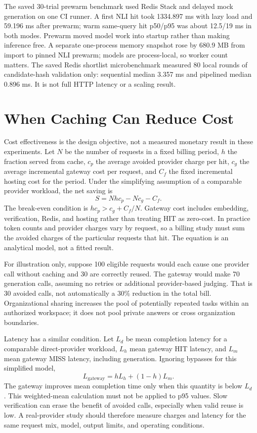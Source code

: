 The saved 30-trial prewarm benchmark used Redis Stack and delayed mock generation on one CI runner. A first NLI hit took 1334.897 ms with lazy load and 59.196 ms after prewarm; warm same-query hit p50/p95 was about 12.5/19 ms in both modes. Prewarm moved model work into startup rather than making inference free. A separate one-process memory snapshot rose by 680.9 MB from import to pinned NLI prewarm; models are process-local, so worker count matters. The saved Redis shortlist microbenchmark measured 80 local rounds of candidate-hash validation only: sequential median 3.357 ms and pipelined median 0.896 ms. It is not full HTTP latency or a scaling result.

\section{When Caching Can Reduce Cost}
Cost effectiveness is the design objective, not a measured monetary result in these experiments. Let $N$ be the number of requests in a fixed billing period, $h$ the fraction served from cache, $c_p$ the average avoided provider charge per hit, $c_g$ the average incremental gateway cost per request, and $C_f$ the fixed incremental hosting cost for the period. Under the simplifying assumption of a comparable provider workload, the net saving is
\begin{equation}
S = N h c_p - N c_g - C_f.
\end{equation}
The break-even condition is $h c_p > c_g + C_f/N$. Gateway cost includes embedding, verification, Redis, and hosting rather than treating HIT as zero-cost. In practice token counts and provider charges vary by request, so a billing study must sum the avoided charges of the particular requests that hit. The equation is an analytical model, not a fitted result.

For illustration only, suppose 100 eligible requests would each cause one provider call without caching and 30 are correctly reused. The gateway would make 70 generation calls, assuming no retries or additional provider-based judging. That is 30 avoided calls, not automatically a 30\% reduction in the total bill. Organizational sharing increases the pool of potentially repeated tasks within an authorized workspace; it does not pool private answers or cross organization boundaries.

Latency has a similar condition. Let $L_d$ be mean completion latency for a comparable direct-provider workload, $L_h$ mean gateway HIT latency, and $L_m$ mean gateway MISS latency, including generation. Ignoring bypasses for this simplified model,
\begin{equation}
L_{\mathrm{gateway}} = hL_h + (1-h)L_m.
\end{equation}
The gateway improves mean completion time only when this quantity is below $L_d$. This weighted-mean calculation must not be applied to p95 values. Slow verification can erase the benefit of avoided calls, especially when valid reuse is low. A real-provider study should therefore measure charges and latency for the same request mix, model, output limits, and operating conditions.


